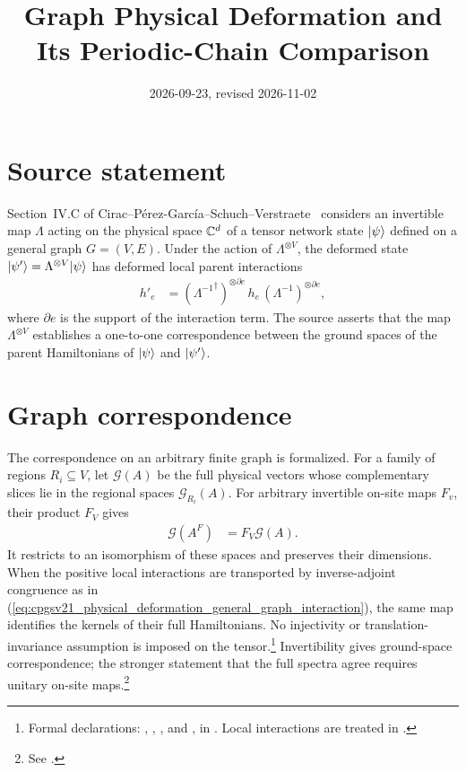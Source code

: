 \documentclass{article}
\title{Graph Physical Deformation and Its Periodic-Chain Comparison}
\author{}
\date{2026-09-23, revised 2026-11-02}
\begin{document}
\maketitle
{}

\section{Source statement}

Section~IV.C of Cirac--P\'erez-Garc\'ia--Schuch--Verstraete~\cite{Cirac2021Matrix}
considers an invertible map $\Lambda$ acting on the physical space $\mathbb{C}^d$ of a
tensor network state $|\psi\rangle$ defined on a general graph $G=(V,E)$. Under the
action of $\Lambda^{\otimes V}$, the deformed state $|\psi'\rangle=\Lambda^{\otimes V}|\psi\rangle$
has deformed local parent interactions
\begin{align}\label{eq:cpgsv21_physical_deformation_general_graph_interaction}
    h'_e & = ({\Lambda^{-1}}^\dagger)^{\otimes \partial e}\,h_e\,(\Lambda^{-1})^{\otimes \partial e},
\end{align}
where $\partial e$ is the support of the interaction term. The source asserts
that the map $\Lambda^{\otimes V}$ establishes a one-to-one correspondence
between the ground spaces of the parent Hamiltonians of $|\psi\rangle$ and $|\psi'\rangle$.

\section{Graph correspondence}

The correspondence on an arbitrary finite graph is formalized. For a family
of regions $R_i\subseteq V$, let $\mathcal G(A)$ be the full physical vectors
whose complementary slices lie in the regional spaces $\mathcal G_{R_i}(A)$.
For arbitrary invertible on-site maps $F_v$, their product $F_V$ gives
\begin{align}\label{eq:cpgsv21_physical_deformation_graph_transport}
    \mathcal G(A^F) & = F_V\mathcal G(A).
\end{align}
It restricts to an isomorphism of these spaces and preserves their
dimensions. When the positive local interactions are transported by
inverse-adjoint congruence as in
(\ref{eq:cpgsv21_physical_deformation_general_graph_interaction}), the same
map identifies the kernels of their full Hamiltonians. No injectivity or
translation-invariance assumption is imposed on the tensor.\footnote{Formal
    declarations: ,
    ,
    , and
    , in
    .
    Local interactions are treated in
    .}
Invertibility gives ground-space correspondence; the stronger statement
that the full spectra agree requires unitary on-site maps.\footnote{See
    .}
\end{document}

